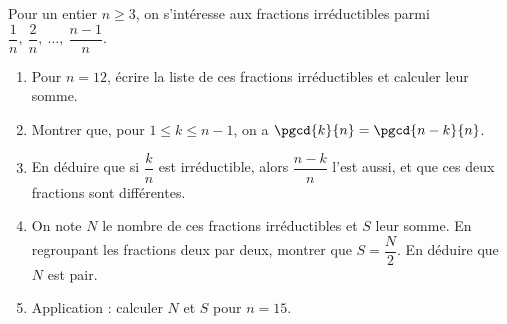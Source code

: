 \begin{exo}\label{exo:arith-39}
      Pour un entier $n \geq 3$, on s'int\'eresse aux fractions irr\'eductibles parmi
      $\dfrac{1}{n},\ \dfrac{2}{n},\ \ldots ,\ \dfrac{n-1}{n}$.
      \begin{enumerate}
            \item Pour $n = 12$, \'ecrire la liste de ces fractions irr\'eductibles et calculer leur somme.
            \item Montrer que, pour $1 \leq k \leq n-1$, on a $\pgcd{k}{n} = \pgcd{n-k}{n}$.
            \item En d\'eduire que si $\dfrac{k}{n}$ est irr\'eductible, alors $\dfrac{n-k}{n}$ l'est aussi,
                  et que ces deux fractions sont diff\'erentes.
            \item On note $N$ le nombre de ces fractions irr\'eductibles et $S$ leur somme.
                  En regroupant les fractions deux par deux, montrer que $S = \dfrac{N}{2}$.
                  En d\'eduire que $N$ est pair.
            \item Application : calculer $N$ et $S$ pour $n = 15$.
      \end{enumerate}
\end{exo}

